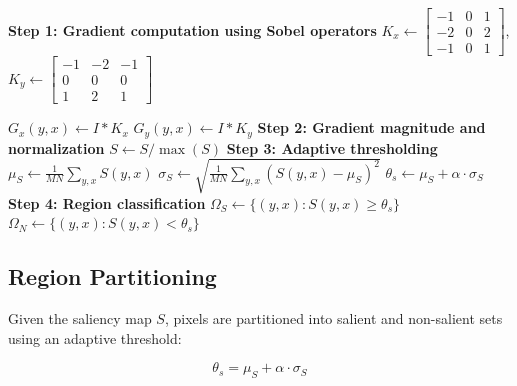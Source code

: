 \documentclass{ipol}
\begin{document}
\begin{algorithm}[!htbp]
\caption{Saliency Detection and Region Partitioning}\label{alg:saliency}
\BlankLine
\textbf{Step 1: Gradient computation using Sobel operators}\;
$K_x \gets \begin{bmatrix} -1 & 0 & 1 \\ -2 & 0 & 2 \\ -1 & 0 & 1 \end{bmatrix}$,
$K_y \gets \begin{bmatrix} -1 & -2 & -1 \\ 0 & 0 & 0 \\ 1 & 2 & 1 \end{bmatrix}$\;

$G_x(y,x) \gets I \ast K_x$ 
$G_y(y,x) \gets I \ast K_y$ 
\BlankLine
\textbf{Step 2: Gradient magnitude and normalization}\;
$S \gets S / \max(S)$ 
\BlankLine
\textbf{Step 3: Adaptive thresholding}\;
$\mu_S \gets \frac{1}{MN} \sum_{y,x} S(y,x)$ 
$\sigma_S \gets \sqrt{\frac{1}{MN} \sum_{y,x} (S(y,x) - \mu_S)^2}$ 
$\theta_s \gets \mu_S + \alpha \cdot \sigma_S$ 
\BlankLine
\textbf{Step 4: Region classification}\;
$\Omega_S \gets \{(y,x) : S(y,x) \geq \theta_s\}$ 
$\Omega_N \gets \{(y,x) : S(y,x) < \theta_s\}$ 
\;
\end{algorithm}

\subsection{Region Partitioning}

Given the saliency map $S$, pixels are partitioned into salient and non-salient sets using an adaptive threshold:

\begin{equation}
\theta_s = \mu_S + \alpha \cdot \sigma_S
\label{eq:threshold}
\end{equation}
\end{document}
